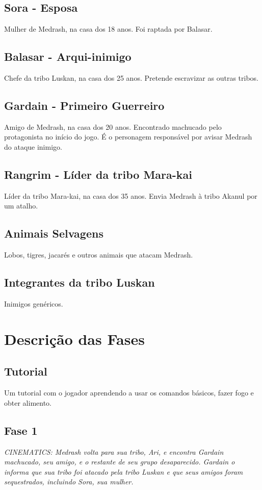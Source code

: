 \documentclass[letterpaper,11pt]{article}
\begin{document}
\subsection{Sora - Esposa}
Mulher de Medrash, na casa dos 18 anos. Foi raptada por Balasar.

\subsection{Balasar - Arqui-inimigo}
Chefe da tribo Luskan, na casa dos 25 anos. Pretende escravizar as outras tribos.

\subsection{Gardain - Primeiro Guerreiro}
Amigo de Medrash, na casa dos 20 anos. Encontrado machucado pelo protagonista no início do jogo. É o personagem responsável por avisar Medrash do ataque inimigo.

\subsection{Rangrim - Líder da tribo Mara-kai}
Líder da tribo Mara-kai, na casa dos 35 anos.
Envia Medrash à tribo Akanul por um atalho.

\subsection{Animais Selvagens}
Lobos, tigres, jacarés e outros animais que atacam Medrash.

\subsection{Integrantes da tribo Luskan}
Inimigos genéricos.

\section{Descrição das Fases}
  \subsection{Tutorial}
Um tutorial com o jogador aprendendo a usar os comandos básicos, fazer fogo e obter alimento.

  \subsection{Fase 1}
{\it CINEMATICS: Medrash volta para sua tribo, Ari, e encontra Gardain machucado, seu amigo, e o restante de seu grupo desaparecido.
Gardain o informa que sua tribo foi atacado pela tribo Luskan e que seus amigos foram sequestrados, incluindo Sora, sua mulher.}
\end{document}
